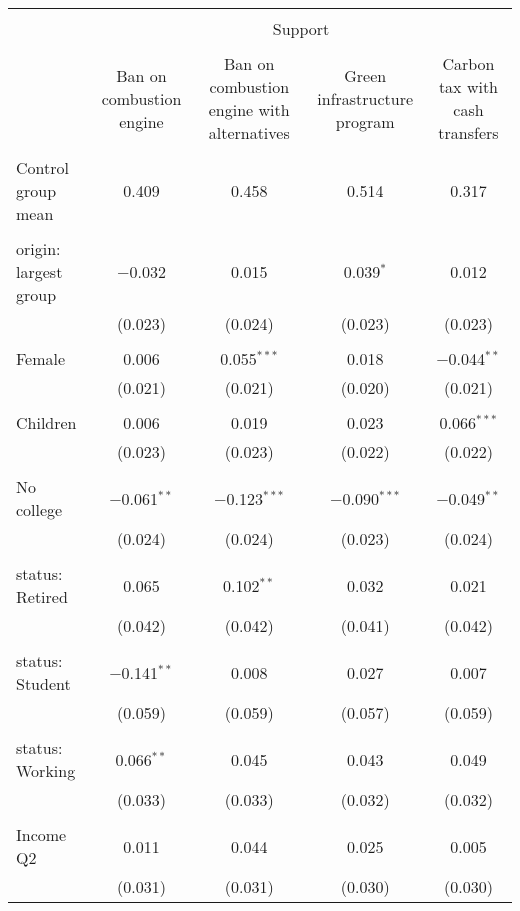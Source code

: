 
\begin{tabular}{@{\extracolsep{5pt}}lcccc} 
\\[-1.8ex]\hline 
\hline \\[-1.8ex] 
 & \multicolumn{4}{c}{Support} \\ 
\cline{2-5} 
\\[-1.8ex] & Ban on combustion engine & Ban on combustion engine with alternatives & Green infrastructure program & Carbon tax with cash transfers \\ 
\hline \\[-1.8ex] 
 Control group mean & 0.409 & 0.458 & 0.514 & 0.317  \\ \hline \\[-1.8ex] origin: largest group & $-$0.032 & 0.015 & 0.039$^{*}$ & 0.012 \\ 
  & (0.023) & (0.024) & (0.023) & (0.023) \\ 
  & & & & \\ 
 Female & 0.006 & 0.055$^{***}$ & 0.018 & $-$0.044$^{**}$ \\ 
  & (0.021) & (0.021) & (0.020) & (0.021) \\ 
  & & & & \\ 
 Children & 0.006 & 0.019 & 0.023 & 0.066$^{***}$ \\ 
  & (0.023) & (0.023) & (0.022) & (0.022) \\ 
  & & & & \\ 
 No college & $-$0.061$^{**}$ & $-$0.123$^{***}$ & $-$0.090$^{***}$ & $-$0.049$^{**}$ \\ 
  & (0.024) & (0.024) & (0.023) & (0.024) \\ 
  & & & & \\ 
 status: Retired & 0.065 & 0.102$^{**}$ & 0.032 & 0.021 \\ 
  & (0.042) & (0.042) & (0.041) & (0.042) \\ 
  & & & & \\ 
 status: Student & $-$0.141$^{**}$ & 0.008 & 0.027 & 0.007 \\ 
  & (0.059) & (0.059) & (0.057) & (0.059) \\ 
  & & & & \\ 
 status: Working & 0.066$^{**}$ & 0.045 & 0.043 & 0.049 \\ 
  & (0.033) & (0.033) & (0.032) & (0.032) \\ 
  & & & & \\ 
 Income Q2 & 0.011 & 0.044 & 0.025 & 0.005 \\ 
  & (0.031) & (0.031) & (0.030) & (0.030) \\ 

\end{tabular}
